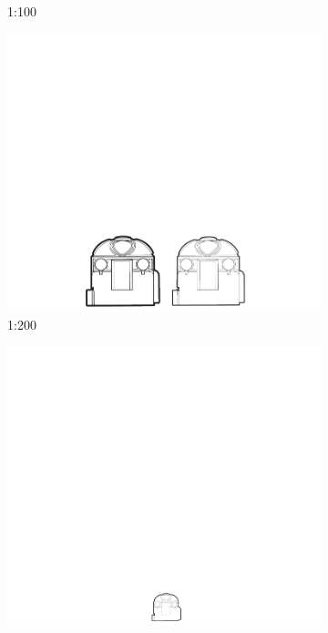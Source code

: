 \begin{figure}[h!tbp]
\begin{subfigure}{.5\textwidth}
  \caption{1:100}
\end{subfigure}
\begin{subfigure}{.5\textwidth}
  \centering
  \includegraphics[width=.98\linewidth]{bilder/vektor_massstaeblichkeitCAD-1-200.pdf}
  \caption{1:200}
\end{subfigure}%
\begin{subfigure}{.5\textwidth}
  \centering
  \includegraphics[width=.98\linewidth]{bilder/vektor_massstaeblichkeitCAD-1-500.pdf}

\end{subfigure}
\end{figure}
